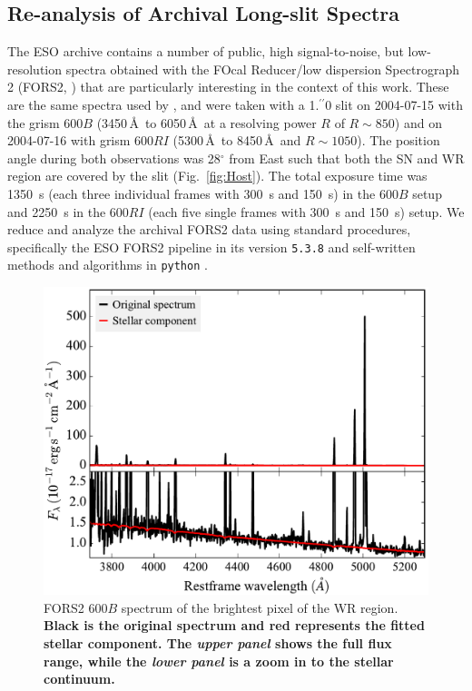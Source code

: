 \documentclass[traditabstract, referee]{aa}
\newcommand{\farc}{\hbox{$.\!\!^{\prime\prime}$}}
\begin{document}
\begin{appendix}

\section{Re-analysis of Archival Long-slit Spectra}
\label{app:fors}

The ESO archive contains a number of public, high signal-to-noise, but low-resolution spectra obtained with the FOcal Reducer/low dispersion Spectrograph 2 (FORS2, \citealt{1998Msngr..94....1A}) that are particularly interesting in the context of this work. These are the same spectra used by \citet{2006A&A...454..103H}, and were taken with a 1\farc{0} slit on 2004-07-15 with the grism 600$B$ (3450\,\AA\, to 6050\,\AA\, at a resolving power $R$ of $R\sim850$) and on 2004-07-16 with grism 600$RI$ (5300\,\AA\, to 8450\,\AA\, and $R\sim1050$). The position angle during both observations was 28$^\circ$ from East such that both the SN and WR region are covered by the slit (Fig.~\ref{fig:Host}). The total exposure time was 1350~s (each three individual frames with 300~s and 150~s) in the 600$B$ setup and 2250~s in the 600$RI$ (each five single frames with 300~s and 150~s) setup. We reduce and analyze the archival FORS2 data using standard procedures, specifically the ESO FORS2 pipeline in its version \texttt{5.3.8} and self-written methods and algorithms in \texttt{python} \citep{2015A&A...581A.125K}.

\begin{figure}
\includegraphics[angle=0, width=0.93\columnwidth]{Figs/FORS2_3700_5300_starlight.pdf}
\caption{FORS2 600$B$ spectrum of the brightest pixel of the WR region. \textbf{Black is the original spectrum and red represents the fitted stellar component. The \textit{upper panel} shows the full flux range, while the \textit{lower panel} is a zoom in to the stellar continuum.}}
\label{fig:FORSWR}
\end{figure}


\end{appendix}
\end{document}
